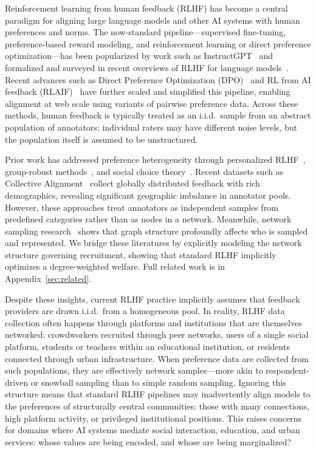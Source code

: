 \documentclass{article}
\theoremstyle{plain}
\theoremstyle{definition}
\theoremstyle{remark}
\begin{document}
Reinforcement learning from human feedback (RLHF) has become a central paradigm for aligning large language models and other AI systems with human preferences and norms.
The now-standard pipeline---supervised fine-tuning, preference-based reward modeling, and reinforcement learning or direct preference optimization---has been popularized by work such as InstructGPT~\citep{ouyang2022instructgpt} and formalized and surveyed in recent overviews of RLHF for language models~\citep{kaufmann2025survey,lambert2025rlhfbook}.
Recent advances such as Direct Preference Optimization (DPO)~\citep{rafailov2023dpo} and RL from AI feedback (RLAIF)~\citep{lee2024rlaif} have further scaled and simplified this pipeline, enabling alignment at web scale using variants of pairwise preference data.
Across these methods, human feedback is typically treated as an i.i.d.\ sample from an abstract population of annotators: individual raters may have different noise levels, but the population itself is assumed to be unstructured.

Prior work has addressed preference heterogeneity through personalized RLHF~\citep{poddar2024vpl}, group-robust methods~\citep{chakraborty2024maxminrlhf,ramesh2024grpo}, and social choice theory~\citep{ge2024axioms,dai2024mapping,conitzer2024socialchoice}.
Recent datasets such as Collective Alignment~\citep{openai2025ca1} collect globally distributed feedback with rich demographics, revealing significant geographic imbalance in annotator pools. However, these approaches treat annotators as independent samples from predefined categories rather than as nodes in a network.
Meanwhile, network sampling research~\citep{wejnert2010rds,lerman2016majorityillusion,saxena2024fairsna,dong2021edits} shows that graph structure profoundly affects who is sampled and represented. We bridge these literatures by explicitly modeling the network structure governing recruitment, showing that standard RLHF implicitly optimizes a degree-weighted welfare. Full related work is in Appendix~\ref{sec:related}.

Despite these insights, current RLHF practice implicitly assumes that feedback providers are drawn i.i.d.\ from a homogeneous pool.
In reality, RLHF data collection often happens through platforms and institutions that are themselves networked: crowdworkers recruited through peer networks, users of a single social platform, students or teachers within an educational institution, or residents connected through urban infrastructure.
When preference data are collected from such populations, they are effectively network samples---more akin to respondent-driven or snowball sampling than to simple random sampling.
Ignoring this structure means that standard RLHF pipelines may inadvertently align models to the preferences of structurally central communities: those with many connections, high platform activity, or privileged institutional positions.
This raises concerns for domains where AI systems mediate social interaction, education, and urban services: whose values are being encoded, and whose are being marginalized?
\end{document}
